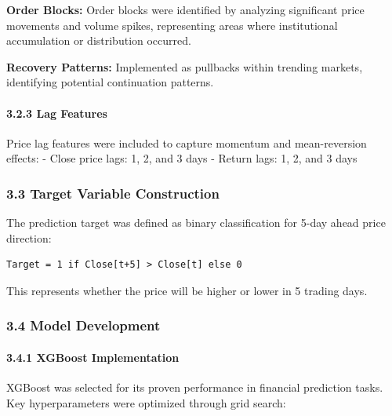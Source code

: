 \textbf{Order Blocks:} Order blocks were identified by analyzing
significant price movements and volume spikes, representing areas where
institutional accumulation or distribution occurred.

\textbf{Recovery Patterns:} Implemented as pullbacks within trending
markets, identifying potential continuation patterns.

\paragraph{3.2.3 Lag Features}\label{lag-features}

Price lag features were included to capture momentum and mean-reversion
effects: - Close price lags: 1, 2, and 3 days - Return lags: 1, 2, and 3
days

\subsubsection{3.3 Target Variable
Construction}\label{target-variable-construction}

The prediction target was defined as binary classification for 5-day
ahead price direction:

\begin{verbatim}
Target = 1 if Close[t+5] > Close[t] else 0
\end{verbatim}

This represents whether the price will be higher or lower in 5 trading
days.

\subsubsection{3.4 Model Development}\label{model-development}

\paragraph{3.4.1 XGBoost Implementation}\label{xgboost-implementation}

XGBoost was selected for its proven performance in financial prediction
tasks. Key hyperparameters were optimized through grid search:

\begin{Shaded}
\begin{Highlighting}[]
\OperatorTok{=}\NormalTok{ \{}
    \NormalTok{: }\NormalTok{,}
    \NormalTok{: }\NormalTok{,}
    \NormalTok{: }\NormalTok{,}
    \NormalTok{: }\NormalTok{,  }
    \NormalTok{: }\NormalTok{,}
    \NormalTok{: }
\NormalTok{\}}
\end{Highlighting}
\end{Shaded}

